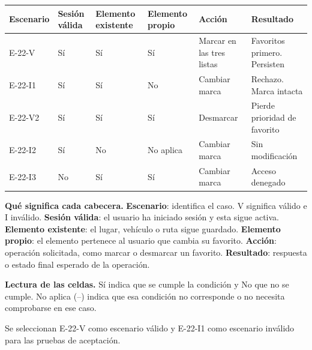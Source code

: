 \begingroup\fontsize{7.8}{11}\selectfont\setlength{\tabcolsep}{3pt}
\begin{tabularx}{\linewidth}{@{}*{6}{Y}@{}}\toprule
\textbf{Escenario} & \textbf{Sesión válida} & \textbf{Elemento existente} & \textbf{Elemento propio} & \textbf{Acción} & \textbf{Resultado}\\\midrule
E-22-V & Sí & Sí & Sí & Marcar en las tres listas & Favoritos primero. Persisten\\[3pt]
E-22-I1 & Sí & Sí & No & Cambiar marca & Rechazo. Marca intacta\\[3pt]
E-22-V2 & Sí & Sí & Sí & Desmarcar & Pierde prioridad de favorito\\[3pt]
E-22-I2 & Sí & No & No aplica & Cambiar marca & Sin modificación\\[3pt]
E-22-I3 & No & Sí & Sí & Cambiar marca & Acceso denegado\\[3pt]
\bottomrule\end{tabularx}\endgroup\par
{\fontsize{9}{11}\selectfont\textbf{Qué significa cada cabecera.} \textbf{Escenario}: identifica el caso. V significa válido e I inválido. \textbf{Sesión válida}: el usuario ha iniciado sesión y esta sigue activa. \textbf{Elemento existente}: el lugar, vehículo o ruta sigue guardado. \textbf{Elemento propio}: el elemento pertenece al usuario que cambia su favorito. \textbf{Acción}: operación solicitada, como marcar o desmarcar un favorito. \textbf{Resultado}: respuesta o estado final esperado de la operación.\par\textbf{Lectura de las celdas.} Sí indica que se cumple la condición y No que no se cumple. No aplica (--) indica que esa condición no corresponde o no necesita comprobarse en ese caso.\par}


Se seleccionan E-22-V como escenario válido y E-22-I1 como escenario inválido para las pruebas de aceptación.\par


